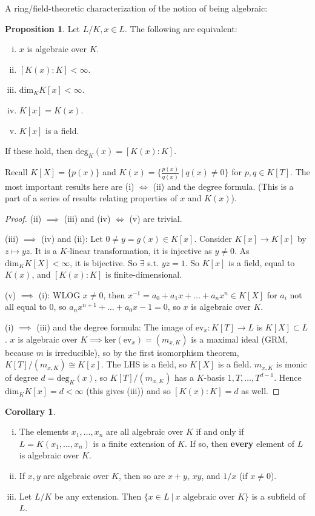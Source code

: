 \documentclass{article}
\theoremstyle{definition}
\newtheorem{cor}[theorem]{Corollary}
\newtheorem{prop}[theorem]{Proposition}
\begin{document}
A ring/field-theoretic characterization of the notion of being algebraic:
\begin{prop}
    Let $L/K, x \in L$. The following are equivalent:
    \begin{enumerate}[(i)]
        \item $x$ is algebraic over $K$.
        \item $[K(x) : K] < \infty$.
        \item $\text{dim}_K K[x] < \infty$.
        \item $K[x] = K(x)$.
        \item $K[x]$ is a field.
    \end{enumerate}
    If these hold, then $\text{deg}_K(x) = [K(x) : K]$.
\end{prop}
Recall $K[X] = \{p(x)\}$ and $K(x) = \{\frac{p(x)}{q(x)}~|~ q(x) \neq 0\}$ for $p,q \in K[T]$. The most important results here are (i) $\iff$ (ii) and the degree formula. (This is a part of a series of results relating properties of $x$ and $K(x)$).
\begin{proof}
    (ii) $\implies $ (iii) and (iv) $\iff$ (v) are trivial.
    \vspace{1mm}

    (iii) $\implies$ (iv) and (ii): Let $0 \neq y = g(x) \in K[x]$. Consider $K[x] \to K[x]$ by $z \mapsto yz$. It is a $K$-linear transformation, it is injective as $y\neq 0$. As $\text{dim}_K K[X] < \infty$, it is bijective. So $\exists $ s.t. $yz = 1$. So $K[x]$ is a field, equal to $K(x)$, and $[K(x):K]$ is finite-dimensional.
    \vspace{1mm}

    (v) $\implies$ (i): WLOG $x\neq 0$, then $x^{-1} = a_0 + a_1x + \ldots + a_n x^n \in K[X]$ for $a_i$ not all equal to $0$, so $a_nx^{n+1} + \ldots + a_0x - 1 =0$, so $x$ is algebraic over $K$.
    \vspace{1mm}

    (i) $\implies$ (iii) and the degree formula: The image of $\text{ev}_x : K[T] \to L$ is $K[X] \subset L$. $x$ is algebraic over $K \implies \text{ker}(\text{ev}_x) = (m_{x,K})$ is a maximal ideal (GRM, because $m$ is irreducible), so by the first isomorphism theorem, $K[T]/(m_{x,K}) \cong K[x]$. The LHS is a field, so $K[X]$ is a field. $m_{x,K}$ is monic of degree $d = \text{deg}_K(x)$, so $K[T]/(m_{x,K})$ has a $K$-basis $1,T,\ldots,T^{d-1}$. Hence $\text{dim}_K K[x] = d < \infty$ (this gives (iii)) and so $[K(x) : K] = d$ as well.
\end{proof}
\begin{cor}
    \begin{enumerate}[(i)]
        \item The elements $x_1,\ldots,x_n$ are all algebraic over $K$ if and only if ${L = K(x_1,\ldots,x_n)}$ is a finite extension of $K$. If so, then \textbf{every} element of $L$ is algebraic over $K$.
        \item If $x,y$ are algebraic over $K$, then so are $x+y$, $xy$, and $1/x$ (if $x \neq 0$).
        \item Let $L/K$ be any extension. Then $\{x \in L ~|~ x \text{ algebraic over }K\}$ is a subfield of $L$.
    \end{enumerate}
\end{cor}
\end{document}
